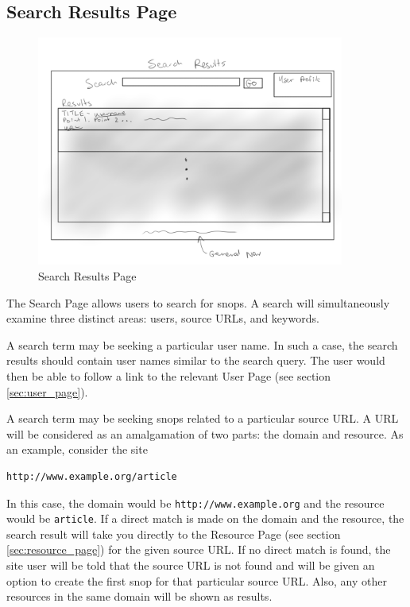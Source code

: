 \documentclass[11pt]{article}
\begin{document}
\subsection{Search Results Page}
\label{sec:search_results_page}
\begin{figure}[htb]
\begin{center}
\includegraphics[width=0.9\textwidth]{search_results.png}
\caption{Search Results Page}
\label{fig:fig_search_results_page}
\end{center}
\end{figure}
The Search Page allows users to search for snops. A search will simultaneously examine three distinct areas: users, source URLs, and keywords.

A search term may be seeking a particular user name. In such a case, the search results should contain user names similar to the search query. The user would then be able to follow a link to the relevant User Page (see section \ref{sec:user_page}).

A search term may be seeking snops related to a particular source URL. A URL will be considered as an amalgamation of two parts: the domain and resource. As an example, consider the site 

\begin{verbatim}http://www.example.org/article\end{verbatim}

In this case, the domain would be \texttt{http://www.example.org} and the resource would be \texttt{article}. If a direct match is made on the domain and the resource, the search result will take you directly to the Resource Page (see section \ref{sec:resource_page}) for the given source URL. If no direct match is found, the site user will be told that the source URL is not found and will be given an option to create the first snop for that particular source URL. Also, any other resources in the same domain will be shown as results.
\end{document}
